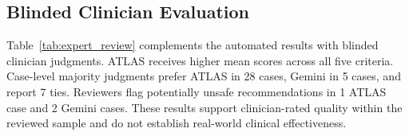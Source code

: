 \subsection{Blinded Clinician Evaluation}

Table~\ref{tab:expert_review} complements the automated results with blinded
clinician judgments. ATLAS receives higher mean scores across all five
criteria. Case-level majority judgments prefer ATLAS in 28 cases,
Gemini in 5 cases, and report 7 ties. Reviewers flag potentially
unsafe recommendations in 1 ATLAS case and 2 Gemini
cases. These results support clinician-rated quality within the reviewed
sample and do not establish real-world clinical effectiveness.

